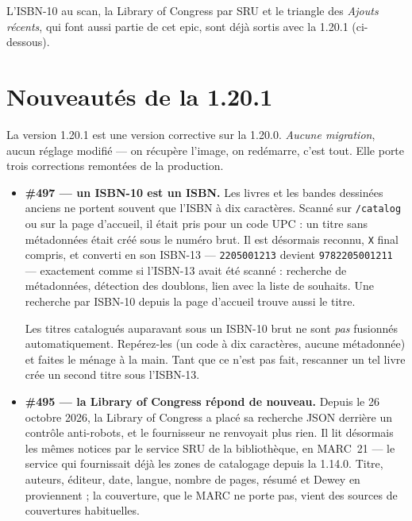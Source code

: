 L'ISBN-10 au scan, la Library of Congress par SRU et le triangle des
\emph{Ajouts récents}, qui font aussi partie de cet epic, sont déjà
sortis avec la 1.20.1 (ci-dessous).

\section{Nouveautés de la 1.20.1}\label{sec:whats-new-1.20.1}

La version 1.20.1 est une version corrective sur la 1.20.0.
\emph{Aucune migration}, aucun réglage modifié --- on récupère
l'image, on redémarre, c'est tout. Elle porte trois corrections
remontées de la production.

\begin{itemize}
  \item \textbf{\#497 \string— un ISBN-10 est un ISBN.} Les livres et
        les bandes dessinées anciens ne portent souvent que l'ISBN à
        dix caractères. Scanné sur \texttt{/catalog} ou sur la page
        d'accueil, il était pris pour un code UPC : un titre sans
        métadonnées était créé sous le numéro brut. Il est désormais
        reconnu, \texttt{X} final compris, et converti en son ISBN-13
        --- \texttt{2205001213} devient \texttt{9782205001211} ---
        exactement comme si l'ISBN-13 avait été scanné : recherche de
        métadonnées, détection des doublons, lien avec la liste de
        souhaits. Une recherche par ISBN-10 depuis la page d'accueil
        trouve aussi le titre.

        Les titres catalogués auparavant sous un ISBN-10 brut ne sont
        \emph{pas} fusionnés automatiquement. Repérez-les (un code à
        dix caractères, aucune métadonnée) et faites le ménage à la
        main. Tant que ce n'est pas fait, rescanner un tel livre crée
        un second titre sous l'ISBN-13.
  \item \textbf{\#495 \string— la Library of Congress répond de
        nouveau.} Depuis le 26 octobre 2026, la Library of Congress a
        placé sa recherche JSON derrière un contrôle anti-robots, et le
        fournisseur ne renvoyait plus rien. Il lit désormais les mêmes
        notices par le service SRU de la bibliothèque, en MARC~21 ---
        le service qui fournissait déjà les zones de catalogage depuis
        la 1.14.0. Titre, auteurs, éditeur, date, langue, nombre de
        pages, résumé et Dewey en proviennent ; la couverture, que le
        MARC ne porte pas, vient des sources de couvertures habituelles.


\end{itemize}
